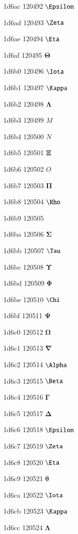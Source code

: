 \documentclass[11pt]{article}
\begin{document}
1d6ac 120492 \ensuremath{\mathbf{\Epsilon}}

1d6ad 120493 \ensuremath{\mathbf{\Zeta}}

1d6ae 120494 \ensuremath{\mathbf{\Eta}}

1d6af 120495 \ensuremath{\mathbf{\Theta}}

1d6b0 120496 \ensuremath{\mathbf{\Iota}}

1d6b1 120497 \ensuremath{\mathbf{\Kappa}}

1d6b2 120498 \ensuremath{\mathbf{\Lambda}}

1d6b3 120499 \ensuremath{M}

1d6b4 120500 \ensuremath{N}

1d6b5 120501 \ensuremath{\mathbf{\Xi}}

1d6b6 120502 \ensuremath{O}

1d6b7 120503 \ensuremath{\mathbf{\Pi}}

1d6b8 120504 \ensuremath{\mathbf{\Rho}}

1d6b9 120505 \mathbf{\vartheta}

1d6ba 120506 \ensuremath{\mathbf{\Sigma}}

1d6bb 120507 \ensuremath{\mathbf{\Tau}}

1d6bc 120508 \ensuremath{\mathbf{\Upsilon}}

1d6bd 120509 \ensuremath{\mathbf{\Phi}}

1d6be 120510 \ensuremath{\mathbf{\Chi}}

1d6bf 120511 \ensuremath{\mathbf{\Psi}}

1d6c0 120512 \ensuremath{\mathbf{\Omega}}

1d6c1 120513 \ensuremath{\mathbf{\nabla}}

1d6c2 120514 \ensuremath{\mathbf{\Alpha}}

1d6c3 120515 \ensuremath{\mathbf{\Beta}}

1d6c4 120516 \ensuremath{\mathbf{\Gamma}}

1d6c5 120517 \ensuremath{\mathbf{\Delta}}

1d6c6 120518 \ensuremath{\mathbf{\Epsilon}}

1d6c7 120519 \ensuremath{\mathbf{\Zeta}}

1d6c8 120520 \ensuremath{\mathbf{\Eta}}

1d6c9 120521 \ensuremath{\mathbf{\theta}}

1d6ca 120522 \ensuremath{\mathbf{\Iota}}

1d6cb 120523 \ensuremath{\mathbf{\Kappa}}

1d6cc 120524 \ensuremath{\mathbf{\Lambda}}
\end{document}

